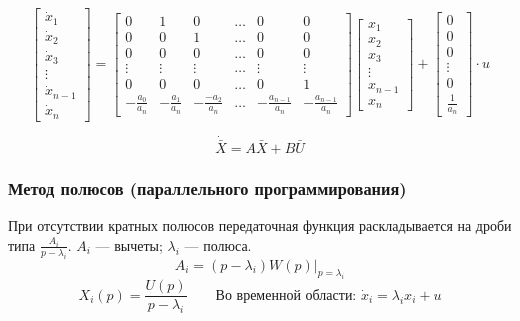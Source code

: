 \[
  \begin{bmatrix}
    \dot x_1 \\ \dot x_2 \\\dot x_3 \\ \vdots \\
    \dot x_{n-1} \\ \dot x_n 
  \end{bmatrix} = 
  \begin{bmatrix} 0 & 1 & 0 & \hdots & 0 & 0 \\
										0 & 0 & 1 & \hdots & 0 & 0 \\
										0 & 0 & 0 & \hdots & 0 & 0 \\
										\vdots & \vdots & \vdots & \hdots & \vdots & \vdots \\
										0 & 0 & 0 & \hdots & 0 & 1\\
										-\frac{a_0}{a_n} & -\frac{a_1}{a_n} & -\frac{-a_2}{a_n} &
										\hdots & -\frac{a_{n-1}}{a_n} & -\frac{a_{n-1}}{a_n} 
										\end{bmatrix}	\begin{bmatrix} 
		x_1 \\ x_2 \\ x_3 \\ \vdots \\ x_{n-1} \\ x_n
										\end{bmatrix} + \begin{bmatrix}
									0 \\ 0 \\ 0 \\ \vdots \\ 0 \\ \frac{1}{a_n} 
									\end{bmatrix} \cdot u
\] 
  
\[
  \dot{\bar X} = A \bar X + B \bar U
\] 

\subsubsection{Метод полюсов (параллельного программирования)}
При отсутствии кратных полюсов передаточная функция раскладывается на дроби
типа $\frac{A_i}{p - \lambda_i}$. $A_i$ --- вычеты; $\lambda_i$ --- полюса.
\[
  A_i = \left.(p - \lambda_i) W(p)\right|_{p=\lambda_i}
\] 
\[
  X_i(p) = \frac{U(p)}{p-\lambda_i} \qquad \text{Во временной области: } \dot x_i
  = \lambda_i x_i + u
\] 

